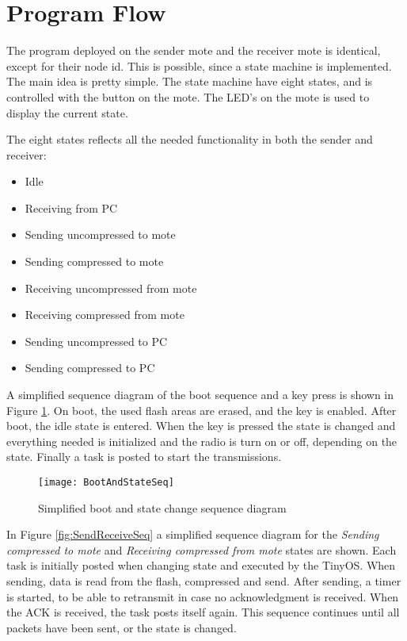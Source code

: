 \section{Program Flow}
The program deployed on the sender mote and the receiver mote is identical, except for their node id.
This is possible, since a state machine is implemented. The main idea is pretty simple. The state machine have eight states, and is controlled with the button on the mote. The LED's on the mote is used to display the current state.


The eight states reflects all the needed functionality in both the sender and receiver:
\begin{itemize}
\item Idle
\item Receiving from PC
\item Sending uncompressed to mote
\item Sending compressed to mote
\item Receiving uncompressed from mote
\item Receiving compressed from mote
\item Sending uncompressed to PC
\item Sending compressed to PC
\end{itemize}

A simplified sequence diagram of the boot sequence and a key press is shown in Figure \ref{fig:BootAndState}. On boot, the used flash areas are erased, and the key is enabled. After boot, the idle state is entered. When the key is pressed the state is changed and everything needed is initialized and the radio is turn on or off, depending on the state. Finally a task is posted to start the transmissions.

\begin{figure}[H]
\centering
\texttt{[image: BootAndStateSeq]}
\caption{Simplified boot and state change sequence diagram}
\label{fig:BootAndState}
\end{figure}

In Figure \ref{fig:SendReceiveSeq} a simplified sequence diagram for the \emph{Sending compressed to mote} and \emph{Receiving compressed from mote} states are shown. Each task is initially posted when changing state and executed by the TinyOS. When sending, data is read from the flash, compressed and send. After sending, a timer is started, to be able to retransmit in case no acknowledgment is received. When the ACK is received, the task posts itself again. This sequence continues until all packets have been sent, or the state is changed.

